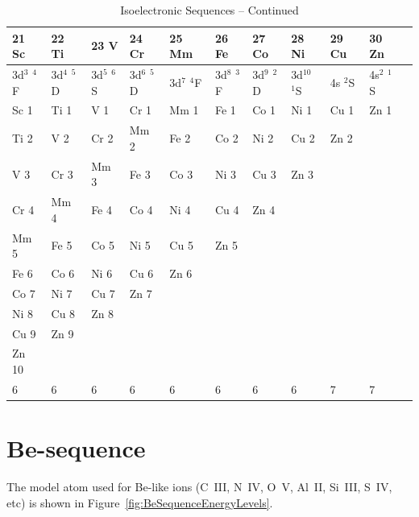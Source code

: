 \begin{table}
\begin{center}
\addtocounter{table}{-1}
\caption{Isoelectronic Sequences -- Continued}
\begin{tabular}{lllllllllll}
\hline
21 Sc&  22 Ti&  23 V&   24 Cr&  25 Mm&  26 Fe&  27 Co&  28 Ni&  29 Cu& 30
Zn\\
\hline
3d$^3$ $^4$F& 3d$^4$
$^5$D& 3d$^5$ $^6$S& 3d$^6$ $^5$D& 3d$^7$ $^4$F& 3d$^8$ $^3$F& 3d$^9$ $^2$D&
3d$^{10}$ $^1$S& 4s $^2$S& 4s$^2$ $^1$S\\
Sc 1& Ti 1& V  1& Cr 1& Mm 1& Fe
1& Co 1& Ni 1& Cu 1& Zn 1\\
Ti 2& V 2& Cr 2& Mm 2& Fe 2& Co 2& Ni 2& Cu 2& Zn 2\\
V  3& Cr 3& Mm 3& Fe 3& Co
3& Ni 3& Cu 3& Zn 3\\
Cr 4& Mm 4& Fe 4& Co 4& Ni 4& Cu 4& Zn 4\\
Mm 5& Fe 5& Co 5& Ni 5& Cu 5& Zn 5\\
Fe 6& Co
6& Ni 6& Cu 6& Zn 6\\
Co 7& Ni 7& Cu 7& Zn 7\\
Ni 8& Cu 8& Zn 8\\
Cu 9& Zn 9\\
Zn 10\\
6&6&6&6&6&6&6&6&7&7\\
\hline
\end{tabular}
\end{center}
\end{table}

\section{Be-sequence}

The model atom used for Be-like ions (C~III, N~IV, O~V, Al~II, Si~III, S~IV,
etc) is shown in Figure~\ref{fig:BeSequenceEnergyLevels}.

